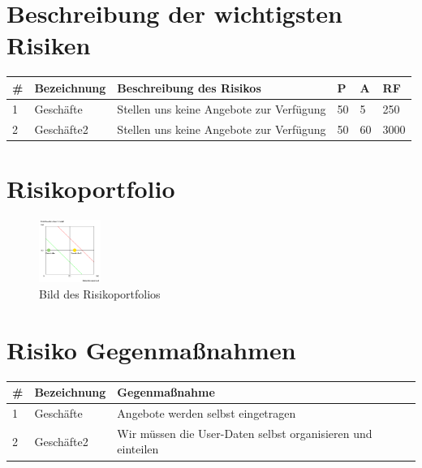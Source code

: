 \hypertarget{beschreibung-der-wichtigsten-risiken}{%
\section{Beschreibung der wichtigsten
Risiken}\label{beschreibung-der-wichtigsten-risiken}}

\begin{longtable}[]{@{}llllll@{}}
\toprule
\# & Bezeichnung & Beschreibung des Risikos & P & A & RF\tabularnewline
\midrule
\endhead
1 & Geschäfte & Stellen uns keine Angebote zur Verfügung & 50 & 5 &
250\tabularnewline
2 & Geschäfte2 & Stellen uns keine Angebote zur Verfügung & 50 & 60 &
3000\tabularnewline
\bottomrule
\end{longtable}

\hypertarget{risikoportfolio}{%
\section{Risikoportfolio}\label{risikoportfolio}}

\begin{figure}
\centering
\includegraphics[width=2cm,height=\textheight]{images/doja/risikoanalyse.png}
\caption{Bild des Risikoportfolios\label{King Bild}}
\end{figure}

\hypertarget{risiko-gegenmauxdfnahmen}{%
\section{Risiko Gegenmaßnahmen}\label{risiko-gegenmauxdfnahmen}}

\begin{longtable}[]{@{}lll@{}}
\toprule
\# & Bezeichnung & Gegenmaßnahme\tabularnewline
\midrule
\endhead
1 & Geschäfte & Angebote werden selbst eingetragen\tabularnewline
2 & Geschäfte2 & Wir müssen die User-Daten selbst organisieren und
einteilen\tabularnewline
\bottomrule
\end{longtable}
